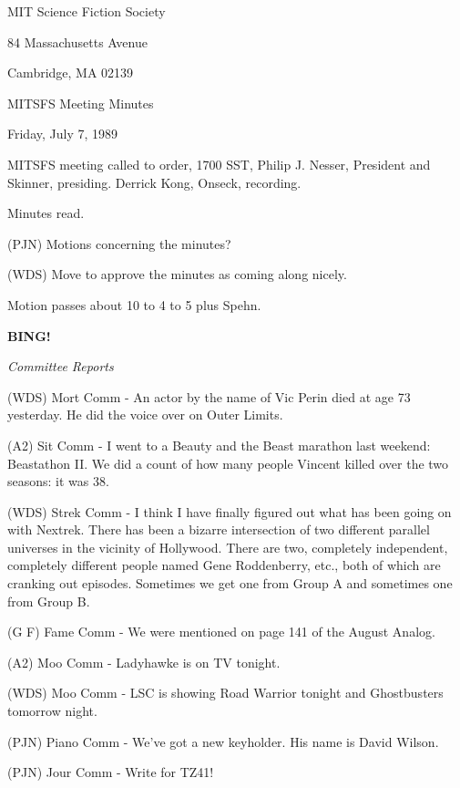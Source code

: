\documentclass[12pt]{article}
\newcommand{\bing}{{\bf BING!} }
\newcommand{\goto}[1]{\bing \vskip 12pt \centerline{{\em{#1}}}}
\begin{document}
\begin{center}

MIT Science Fiction Society 

84 Massachusetts Avenue

Cambridge, MA 02139

\vspace{12pt}

MITSFS Meeting Minutes 

Friday, July 7, 1989

\end{center}
 
\vspace{18pt}

\setlength{\parskip}{6pt}

\noindent
MITSFS meeting called to order, 1700 SST, Philip J. Nesser, President and Skinner, presiding. Derrick Kong, Onseck, recording.

Minutes read.

(PJN) Motions concerning the minutes?

(WDS) Move to approve the minutes as coming along nicely.

Motion passes about 10 to 4 to 5 plus Spehn.

\goto{Committee Reports}

(WDS) Mort Comm - An actor by the name of Vic Perin died at age 73 yesterday. He did the voice over on Outer Limits.

(A2) Sit Comm - I went to a Beauty and the Beast marathon last weekend: Beastathon II.  We did a count of how many people Vincent killed over the two seasons: it was 38.

(WDS) Strek Comm - I think I have finally figured out what has been going on with Nextrek. There has been a bizarre intersection of two different parallel universes in the vicinity of Hollywood. There are two, completely independent, completely different people named Gene Roddenberry, etc., both of which are cranking out episodes. Sometimes we get one from Group A and sometimes one from Group B.

(G F) Fame Comm - We were mentioned on page 141 of the August Analog.

(A2) Moo Comm - Ladyhawke is on TV tonight.

(WDS) Moo Comm - LSC is showing Road Warrior tonight and Ghostbusters tomorrow night.

(PJN) Piano Comm - We've got a new keyholder. His name is David Wilson.

(PJN) Jour Comm - Write for TZ41!
\end{document}

